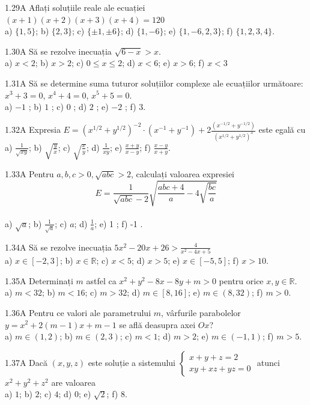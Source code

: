 \documentclass[11pt]{article}
\begin{document}
1.29A Aflați soluțiile reale ale ecuației $(x+1)(x+2)(x+3)(x+4)=120$\\ a) $\{1,5\}$; b) $\{2,3\}$; c) $\{ \pm 1, \pm 6\}$; d) $\{1,-6\}$; e) $\{1,-6,2,3\}$; f) $\{1,2,3,4\}$.

1.30A Să se rezolve inecuația $\sqrt{6-x}>x$.\\ a) $x<2$; b) $x>2$; c) $0 \leq x \leq 2$; d) $x<6$; e) $x>6$; f) $x<3$

1.31A Să se determine suma tuturor soluțiilor complexe ale ecuațiilor următoare: $x^{3}+3=0$, $x^{4}+4=0$, $x^{5}+5=0$.\\ a) $-1$ ; b) $1$ ; c) $0$ ; d) $2$ ; e) $-2$ ; f) $3$.

1.32A Expresia $E=\left(x^{1 / 2}+y^{1 / 2}\right)^{-2} \cdot\left(x^{-1}+y^{-1}\right)+2 \frac{\left(x^{-1 / 2}+y^{-1 / 2}\right)}{\left(x^{1 / 2}+y^{1 / 2}\right)^{3}}$ este egală cu\\ a) $\frac{1}{\sqrt{x y}}$; b) $\sqrt{\frac{y}{x}}$; c) $\sqrt{\frac{x}{y}}$; d) $\frac{1}{x y}$; e) $\frac{x+y}{x-y}$; f) $\frac{x-y}{x+y}$.

1.33A Pentru $a, b, c>0, \sqrt{a b c}>2$, calculați valoarea expresiei $$E=\frac{1}{\sqrt{a b c}-2} \sqrt{\frac{a b c+4}{a}-4 \sqrt{\frac{b c}{a}}}$$\\ a) $\sqrt{a}$; b) $\frac{1}{\sqrt{a}}$; c) $a$; d) $\frac{1}{a}$; e) 1 ; f) -1 .

1.34A Să se rezolve inecuația $5 x^{2}-20 x+26>\frac{4}{x^{2}-4 x+5}$\\ a) $x \in[-2,3]$; b) $x \in \mathbb{R}$; c) $x<5$; d) $x>5$; e) $x \in[-5,5]$; f) $x>10$.

1.35A Determinați $m$ astfel ca $x^{2}+y^{2}-8 x-8 y+m>0$ pentru orice $x, y \in \mathbb{R}$.\\ a) $m<32$; b) $m<16$; c) $m>32$; d) $m \in[8,16]$; e) $m \in(8,32)$; f) $m>0$.

1.36A Pentru ce valori ale parametrului $m$, vârfurile parabolelor $y=x^{2}+2(m-1) x+m-1$ se află deasupra axei $O x$?\\ a) $m \in(1,2)$; b) $m \in(2,3)$; c) $m<1$; d) $m>2$; e) $m \in(-1,1)$; f) $m>5$.

1.37A Dacă $(x, y, z)$ este soluție a sistemului $\left\{\begin{array}{l}x+y+z=2 \\ x y+x z+y z=0\end{array}\right.$ atunci $x^{2}+y^{2}+z^{2}$ are valoarea\\ a) $1$; b) $2$; c) $4$; d) $0$; e) $\sqrt{2}$; f) $8$.
\end{document}
